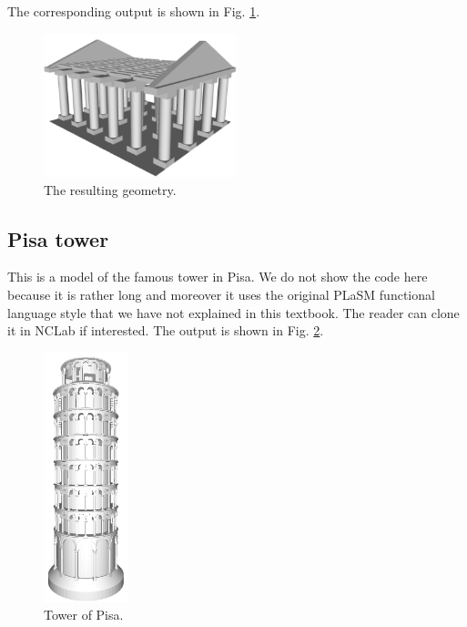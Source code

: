 \documentclass{article}
\begin{document}
The corresponding output is shown in Fig. \ref{fig:temple}.

\begin{figure}[!ht]
\begin{center}
\includegraphics[width=0.5\textwidth]{img/temple.png}
\end{center}
\vspace{-4mm}
\caption{The resulting geometry.}
\label{fig:temple}
\end{figure}
\noindent

\subsection{Pisa tower}

This is a model of the famous tower in Pisa. We do not show the code here 
because it is rather long and moreover it uses the original PLaSM functional
language style that we have not explained in this textbook. 
The reader can clone it in NCLab if interested. The output 
is shown in Fig. \ref{fig:pisa-0}.

\begin{figure}[!ht]
\begin{center}
\includegraphics[width=0.22\textwidth]{img/pisa-0.png}
\end{center}
\vspace{-4mm}
\caption{Tower of Pisa.}
\label{fig:pisa-0}
\vspace{-1.2cm}
\end{figure}


\printindex
\end{document}
